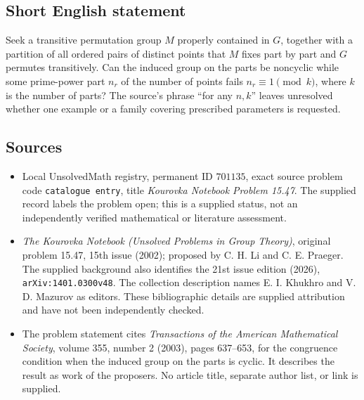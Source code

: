 \documentclass[11pt]{article}
\begin{document}
\subsection{Short English statement}
Seek a transitive permutation group \(M\) properly contained in \(G\), together with a partition of all ordered pairs of distinct points that \(M\) fixes part by part and \(G\) permutes transitively. Can the induced group on the parts be noncyclic while some prime-power part \(n_r\) of the number of points fails \(n_r\equiv1\pmod{k}\), where \(k\) is the number of parts? The source's phrase ``for any \(n,k\)'' leaves unresolved whether one example or a family covering prescribed parameters is requested.
\subsection{Sources}
\begin{itemize}
\item Local UnsolvedMath registry, permanent ID \(701135\), exact source problem code \texttt{catalogue entry}, title \emph{Kourovka Notebook Problem 15.47}. The supplied record labels the problem open; this is a supplied status, not an independently verified mathematical or literature assessment.
\item \emph{The Kourovka Notebook (Unsolved Problems in Group Theory)}, original problem 15.47, 15th issue (2002); proposed by C. H. Li and C. E. Praeger. The supplied background also identifies the 21st issue edition (2026), \texttt{arXiv:1401.0300v48}. The collection description names E. I. Khukhro and V. D. Mazurov as editors. These bibliographic details are supplied attribution and have not been independently checked.
\item The problem statement cites \emph{Transactions of the American Mathematical Society}, volume 355, number 2 (2003), pages 637--653, for the congruence condition when the induced group on the parts is cyclic. It describes the result as work of the proposers. No article title, separate author list, or link is supplied.
\end{itemize}
\end{document}
